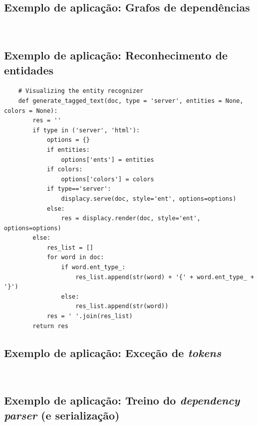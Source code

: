 \documentclass[12pt]{article}
\begin{document}
\setcounter{section}{0}
\setcounter{subsection}{0}


\newpage

\appendixpage
\renewcommand{\thesubsection}{\Alph{subsection}}

\subsection{Exemplo de aplicação: Grafos de dependências}
\label{anexo:dependencias}

\begin{verbatim}
	
\end{verbatim}

\subsection{Exemplo de aplicação: Reconhecimento de entidades}
\label{anexo:reconhecimento}

\begin{verbatim}
	# Visualizing the entity recognizer
	def generate_tagged_text(doc, type = 'server', entities = None, colors = None):
		res = ''
		if type in ('server', 'html'):
			options = {}
			if entities:
				options['ents'] = entities
			if colors:
				options['colors'] = colors
			if type=='server':
				displacy.serve(doc, style='ent', options=options)
			else:
				res = displacy.render(doc, style='ent', options=options)
		else:
			res_list = []
			for word in doc:
				if word.ent_type_:
					res_list.append(str(word) + '{' + word.ent_type_ + '}')
				else:
					res_list.append(str(word))
			res = ' '.join(res_list)
		return res
\end{verbatim}

\subsection{Exemplo de aplicação: Exceção de \textit{tokens}}
\label{anexo:tokens}

\begin{verbatim}
	
\end{verbatim}

\subsection{Exemplo de aplicação: Treino do \textit{dependency parser} (e serialização)}
\label{anexo:treino}
\end{document}
